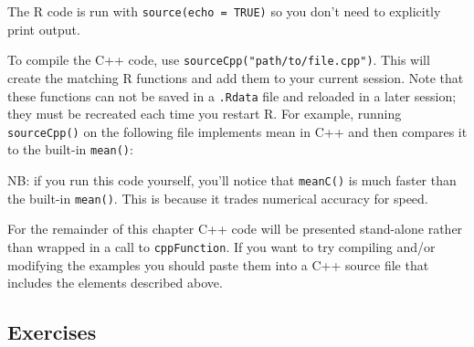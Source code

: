 \begin{Shaded}
\begin{Highlighting}[]
\CommentTok{*/}
\end{Highlighting}
\end{Shaded}

The R code is run with \texttt{source(echo = TRUE)} so you don't need to
explicitly print output.

To compile the C++ code, use \texttt{sourceCpp("path/to/file.cpp")}.
This will create the matching R functions and add them to your current
session. Note that these functions can not be saved in a \texttt{.Rdata}
file and reloaded in a later session; they must be recreated each time
you restart R. For example, running \texttt{sourceCpp()} on the
following file implements mean in C++ and then compares it to the
built-in \texttt{mean()}:

\begin{Shaded}
\begin{Highlighting}[]
  

 
   
   \NormalTok{;}

  \NormalTok{(} 
  \NormalTok{\}}
   
\NormalTok{\}}

\CommentTok{)}
\CommentTok{*/}
\end{Highlighting}
\end{Shaded}

NB: if you run this code yourself, you'll notice that \texttt{meanC()}
is much faster than the built-in \texttt{mean()}. This is because it
trades numerical accuracy for speed.

For the remainder of this chapter C++ code will be presented stand-alone
rather than wrapped in a call to \texttt{cppFunction}. If you want to
try compiling and/or modifying the examples you should paste them into a
C++ source file that includes the elements described above.

\subsection{Exercises}

